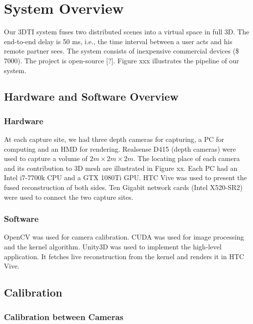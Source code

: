 \section{System Overview}

Our 3DTI system fuses two distributed scenes into a virtual space in full 3D. The end-to-end delay is 50 ms, i.e., the time interval between a user acts and his remote partner sees. The system consists of inexpensive commercial devices (\$ 7000). The project is open-source [?]. Figure xxx illustrates the pipeline of our system.


\subsection{Hardware and Software Overview}

\subsubsection{Hardware}

At each capture site, we had three depth cameras for capturing, a PC for computing and an HMD for rendering. Realsense D415 (depth cameras) were used to capture a volume of $2m \times 2m \times 2m$. The locating place of each camera and its contribution to 3D mesh are illustrated in Figure xx. Each PC had an Intel i7-7700k CPU and a GTX 1080Ti GPU. HTC Vive was used to present the fused reconstruction of both sides. Ten Gigabit network cards (Intel X520-SR2) were used to connect the two capture sites.

\subsubsection{Software}

OpenCV was used for camera calibration. CUDA was used for image processing and the kernel algorithm. Unity3D was used to implement the high-level application. It fetches live reconstruction from the kernel and renders it in HTC Vive.

\subsection{Calibration}

\subsubsection{Calibration between Cameras}

